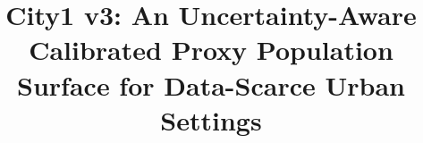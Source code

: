 \documentclass[11pt]{article}
\title{City1 v3: An Uncertainty-Aware Calibrated Proxy Population Surface for Data-Scarce Urban Settings}
\author{}
\date{}
\begin{document}
\maketitle

\begin{abstract}

\end{abstract}














\end{document}

